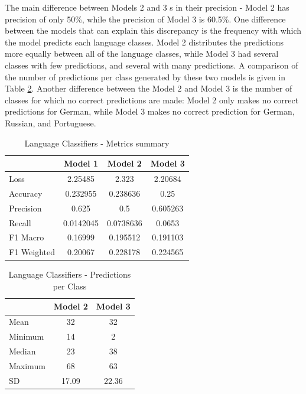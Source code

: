 The main difference between Models 2 and 3 s in their precision - Model 2 has precision of only 50\%, while the precision of Model 3 is 60.5\%. One difference between the models that can explain this discrepancy is the frequency with which the model predicts each language classes. Model 2 distributes the predictions more equally between all of the language classes, while Model 3 had several classes with few predictions, and several with many predictions. A comparison of the number of predictions per class generated by these two models is given in Table \ref{tab:LangPredict}.  Another difference between the Model 2 and Model 3 is the number of classes for which no correct predictions are made: Model 2 only makes no correct predictions for German, while Model 3 makes no correct prediction for German, Russian, and Portuguese.

\begin{table}[h]
\begin{center}
\caption{Language Classifiers - Metrics summary}
\begin{tabular}{l c c c}
		&Model 1		&Model 2		&Model 3 \\ \hline
Loss		&2.25485		&2.323		&2.20684 \\
Accuracy	&0.232955	&0.238636	&0.25\\
Precision	&0.625		&0.5			&0.605263\\
Recall	&0.0142045	&0.0738636	&0.0653 \\ 

F1 Macro	&0.16999		&0.195512	&0.191103\\
F1 Weighted	&0.20067	&0.228178	&0.224565\\
\end{tabular}
\label{tab:LangMetricsSum} 
\end{center}
\end{table} 

\begin{table}[h]
\begin{center}
\caption{Language Classifiers - Predictions per Class}
\begin{tabular}{l c  c}
	& Model 2	& Model 3 \\ \hline
Mean	&32		& 32\\
Minimum	&14		& 2\\
Median	&23		& 38 \\
Maximum	&68		& 63	\\
SD		&17.09	&22.36\\ 

\end{tabular}
\label{tab:LangPredict} 
\end{center}
\end{table} 

